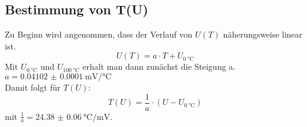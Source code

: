 \documentclass[
  bibliography=totoc,     %
  captions=tableheading,  %
  titlepage=firstiscover, %
]{scrartcl}
\begin{document}
\subsection{Bestimmung von T(U)}
Zu Beginn wird angenommen, dass der Verlauf von $U \left( T \right)$ näherungsweise linear ist.
\begin{equation}
  U \left( T \right) = a \cdot T + U_{\SI{0}{\celsius}}
  \label{eqn:U(T)}
\end{equation}
Mit $U_{\SI{0}{\celsius}}$ und $U_{\SI{100}{\celsius}}$ erhalt man dann zunächst die Steigung a.\\
$a = \SI{0.04102(10)}{\milli\volt\per\celsius}$\\
Damit folgt für $T \left( U \right)$:
\begin{equation}
  T \left( U \right) = \frac{1}{a} \cdot \left( U - U_{\SI{0}{\celsius}} \right)
  \label{eqn:T(U)}
\end{equation}
mit $\frac{1}{a} = \SI{24.38(6)}{\celsius\per\milli\volt}$.
\clearpage
\end{document}
